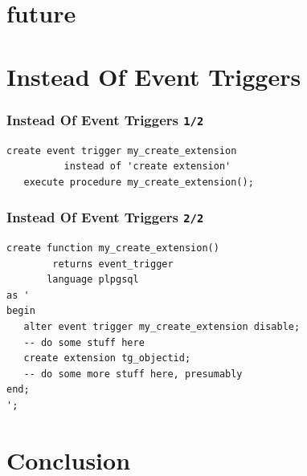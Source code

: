\documentclass{beamer}
\begin{document}
\section{future}


\section{Instead Of Event Triggers}

\begin{frame}[fragile]
  \frametitle{Instead Of Event Triggers \texttt{1/2}}

\begin{verbatim}
create event trigger my_create_extension
          instead of 'create extension'
   execute procedure my_create_extension();

\end{verbatim}
\end{frame}

\begin{frame}[fragile]
  \frametitle{Instead Of Event Triggers \texttt{2/2}}

\begin{verbatim}
create function my_create_extension()
        returns event_trigger
       language plpgsql
as '
begin
   alter event trigger my_create_extension disable;
   -- do some stuff here
   create extension tg_objectid;
   -- do some more stuff here, presumably
end;
';
\end{verbatim}
\end{frame}

\section{Conclusion}

\end{document}
